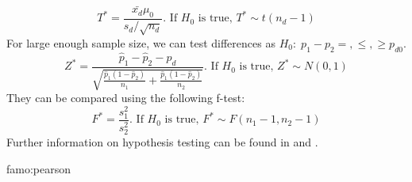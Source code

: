			\begin{equation*}
				T^*=\frac{\bar{x_d}\mu_0}{s_d/\sqrt{n_d}}\text{. If $H_0$ is true, }T^*\sim t(n_d-1)
			\end{equation*}				
			For large enough sample size, we can test differences as $H_0:\;p_1-p_2=,\leq,\geq p_{d0}$.
			\begin{equation*}
					Z^*=\frac{\hat{p}_1-\hat{p}_2-p_d}{\sqrt{\frac{\hat{p}_1(1-\hat{p}_2)}{n_1}+\frac{\hat{p}_1(1-\hat{p}_2)}{n_2}}}\text{. If $H_0$ is true, }Z^*\sim N(0,1)				
			\end{equation*}
			They can be compared using the following f-test:	
			\begin{equation*}
				F^*=\frac{s_1^2}{s_2^2}\text{. If $H_0$ is true, }F^*\sim F(n_1-1,n_2-1)				
			\end{equation*}
		Further information on hypothesis testing can be found in \textcite{Conover.1999} and \textcite[p. 28ff.]{Washington.2011}.		
\begin{famo}{famo:pearson}
	
\end{famo}			